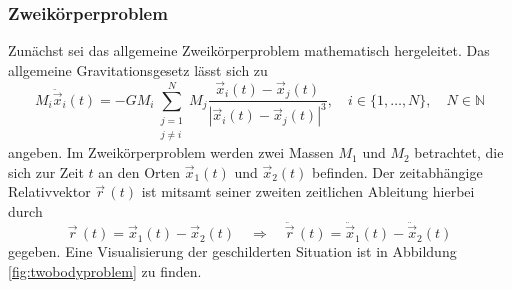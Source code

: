 \documentclass[a4paper,12pt]{article}
\numberwithin{equation}{section}
\begin{document}
\subsubsection{Zweikörperproblem}
Zunächst sei das allgemeine Zweikörperproblem mathematisch hergeleitet. Das allgemeine Gravitationsgesetz lässt sich zu 
\begin{equation}\label{allggravgesetz}
M_i\ddot{\vec{x}}_i(t) = -GM_i\sum_{\substack{j=1\\j\neq i}}^{N}M_j\frac{\vec{x}_i(t)-\vec{x}_j(t)}{|\vec{x}_i(t)-\vec{x}_j(t)|^3},\quad i \in \{1,\dots,N\},\quad N \in \mathbb{N}
\end{equation} angeben. Im Zweikörperproblem werden zwei Massen $M_1$ und $M_2$ betrachtet, die sich zur Zeit $t$ an den Orten $\vec{x}_1(t)$ und $\vec{x}_2(t)$ befinden. Der zeitabhängige Relativvektor $\vec{r}\,(t)$ ist mitsamt seiner zweiten zeitlichen Ableitung hierbei durch \begin{equation}
\vec{r}\,(t) = \vec{x}_1(t) - \vec{x}_2(t) \quad \Rightarrow \quad \ddot{\vec{r}}\,(t) = \ddot{\vec{x}}_1(t) - \ddot{\vec{x}}_2(t)
\end{equation} gegeben. Eine Visualisierung der geschilderten Situation ist in Abbildung \ref{fig:twobodyproblem} zu finden.
\end{document}
